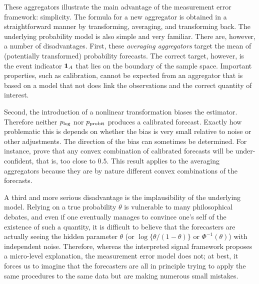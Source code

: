 \documentclass[11pt]{article}
\theoremstyle{definition}
\theoremstyle{definition}
\def\one{{\bf 1}}
\def\probit{p_{\rm probit}}
\def\plog{p_{\rm log}}
\begin{document}
These aggregators illustrate the main advantage of the measurement
error framework: simplicity.  The formula for a new aggregator is
obtained in a straightforward manner by transforming, averaging, and
transforming back.  The underlying probability model is also simple
and very familiar.  There are, however, a number of disadvantages.
First, these \textit{averaging aggregators} target the mean of
(potentially transformed) probability forecasts. The correct target,
however, is the event indicator $\one_A$ that lies on the boundary of
the sample space. Important properties, such as calibration, cannot be
expected from an aggregator that is based on a model that not does link the observations and the correct quantity
of interest.

Second, the introduction of a nonlinear transformation biases the
estimator.  Therefore neither $\plog$ nor $\probit$ produces a
calibrated forecast. Exactly how problematic this is depends on
whether the bias is very small relative to noise or other
adjustments.  The direction of the bias can sometimes be
determined. For instance, \citet{Ranjan08} prove that any convex
combination of calibrated forecasts will be under-confident, that is,
too close to $0.5$. This result applies to the averaging aggregators
because they are by nature different convex combinations of the
forecasts.

A third and more serious disadvantage is the implausibility of the
underlying model. Relying on a true probability $\theta$ is vulnerable to
many philosophical debates, and even if one eventually manages to
convince one's self of the existence of such a quantity, it is
difficult to believe that the forecasters are actually seeing the
hidden parameter $\theta$ (or $\log\{\theta/(1-\theta)\}$ or
$\Phi^{-1}(\theta)$) with independent noise. Therefore, whereas the
interpreted signal framework proposes a micro-level explanation, the
measurement error model does not; at best, it forces us to imagine that
the forecasters are all in principle trying to apply the same
procedures to the same data but are making numerous small mistakes.
\end{document}
